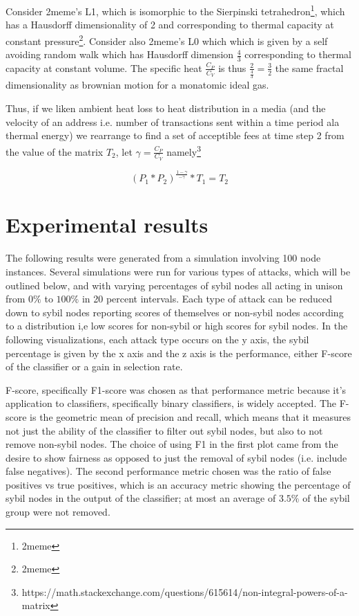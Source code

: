 \documentclass{article}
\begin{document}
Consider 2meme's L1, which is isomorphic to the Sierpinski tetrahedron\footnote{2meme}, which has a Hausdorff dimensionality of 2 and corresponding to thermal capacity at constant pressure\footnote{2meme}. Consider also 2meme's L0 which which is given by a self avoiding random walk which has Hausdorff dimension $\frac{4}{3}$ corresponding to thermal capacity at constant volume. The specific heat $\frac{C_P}{C_V}$ is thus $\frac{2}{\frac{4}{3}} = \frac{3}{2}$ the same fractal dimensionality as brownian motion for a monatomic ideal gas.


Thus, if we liken ambient heat loss to heat distribution in a media (and the velocity of an address i.e. number of transactions sent within a time period ala thermal energy) 
we rearrange to find a set of acceptible fees at time step 2 from the value of the matrix $T_2$, let $ \gamma = \frac{C_P}{C_V}$ namely\footnote{https://math.stackexchange.com/questions/615614/non-integral-powers-of-a-matrix}

\begin{equation}
(P_1 *P_2)^\frac{1- \gamma }{-\gamma} * T_1 = T_2
\end{equation}

\section{Experimental results}
The following results were generated from a simulation involving 100 node instances. Several simulations were run for various types of attacks, which will be outlined below, and with varying percentages of sybil nodes all acting in unison from $0\%$ to $100\%$ in 20 percent intervals. Each type of attack can be reduced down to sybil nodes reporting scores of themselves or non-sybil nodes according to a distribution i,e low scores for non-sybil or high scores for sybil nodes. In the following visualizations, each attack type occurs on the y axis, the sybil percentage is given by the x axis and the z axis is the performance, either F-score of the classifier or a gain in selection rate.

F-score, specifically F1-score was chosen as that performance metric because it's application to classifiers, specifically binary classifiers, is widely accepted. The F-score is the geometric mean of precision and recall, which means that it measures not just the ability of the classifier to filter out sybil nodes, but also to not remove non-sybil nodes. The choice of using F1 in the first plot came from the desire to show fairness as opposed to just the removal of sybil nodes (i.e. include false negatives). The second performance metric chosen was the ratio of false positives vs true positives, which is an accuracy metric showing the percentage of sybil nodes in the output of the classifier; at most an average of $3.5\%$ of the sybil group were not removed. 
\end{document}
